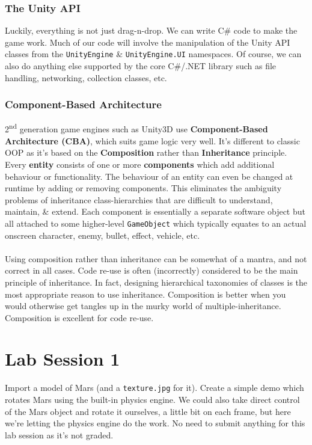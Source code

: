 \documentclass[a4paper,11pt]{article}
\begin{document}
\subsubsection{The Unity API}
Luckily, everything is not just drag-n-drop. 
We can write C\# code to make the game work. 
Much of our code will involve the manipulation of the Unity API classes from the \verb|UnityEngine| \& \verb|UnityEngine.UI| 
namespaces. 
Of course, we can also do anything else supported by the core C\#/.NET library such as file handling, networking, collection 
classes, etc.

\subsubsection{Component-Based Architecture}
2\textsuperscript{nd} generation game engines such as Unity3D use \textbf{Component-Based Architecture (CBA)}, which suits
game logic very well. 
It's different to classic OOP as it's based on the \textbf{Composition} rather than \textbf{Inheritance} principle. 
Every \textbf{entity} consists of one or more \textbf{components} which add additional behaviour or functionality. 
The behaviour of an entity can even be changed at runtime by adding or removing components. 
This eliminates the ambiguity problems of inheritance class-hierarchies that are difficult to understand, maintain, \&
extend.
Each component is essentially a separate software object but all attached to some higher-level \verb|GameObject| which 
typically equates to an actual onscreen character, enemy, bullet, effect, vehicle, etc.
\\\\ 
Using composition rather than inheritance can be somewhat of a mantra, and not correct in all cases. 
Code re-use is often (incorrectly) considered to be the main principle of inheritance. 
In fact, designing hierarchical taxonomies of classes is the most appropriate reason to use inheritance. 
Composition is better when you would otherwise get tangles up in the murky world of multiple-inheritance. 
Composition is excellent for code re-use.

\section{Lab Session 1}
Import a model of Mars (and a \verb|texture.jpg| for it). 
Create a simple demo which rotates Mars using the built-in physics engine. 
We could also take direct control of the Mars object and rotate it ourselves, a little bit on each frame, but here we're 
letting the physics engine do the work.
No need to submit anything for this lab session as it's not graded.
\end{document}

